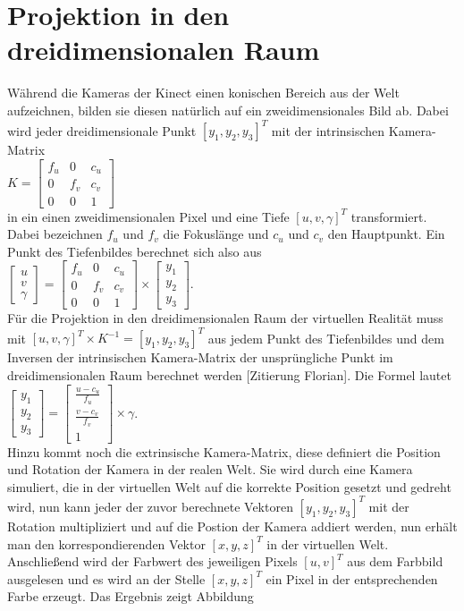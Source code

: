 \documentclass[a4paper]{IEEEtran}
\begin{document}
\section{Projektion in den dreidimensionalen Raum}
Während die Kameras der Kinect einen konischen Bereich aus der Welt aufzeichnen, bilden sie diesen natürlich auf ein zweidimensionales Bild ab. 
Dabei wird jeder dreidimensionale Punkt $[y_1,y_2,y_3]^T$ mit der intrinsischen Kamera-Matrix \\ [1cm]
$K = \begin{bmatrix}
f_u & 0 & c_u  \\
0 & f_v & c_v  \\
0 & 0 & 1  
\end{bmatrix}$\\[1cm]
in ein einen zweidimensionalen Pixel und eine Tiefe $[u,v,\gamma]^T$ transformiert. Dabei bezeichnen $f_u$ und $f_v$ die Fokuslänge und $c_u$ und $c_v$ den Hauptpunkt. Ein Punkt des Tiefenbildes berechnet sich also aus \\[1cm]
$\begin{bmatrix}
u \\
v \\
\gamma
\end{bmatrix}
= \begin{bmatrix}
f_u & 0 & c_u  \\
0 & f_v & c_v  \\
0 & 0 & 1  
\end{bmatrix}
\times
\begin{bmatrix}
y_1 \\
y_2 \\
y_3
\end{bmatrix}$.\\[1cm]
Für die Projektion in den dreidimensionalen Raum der virtuellen Realität muss mit $[u,v,\gamma]^T \times K^{-1} = [y_1,y_2,y_3]^T$ aus jedem Punkt des Tiefenbildes und dem Inversen der intrinsischen Kamera-Matrix der unsprüngliche Punkt im dreidimensionalen Raum berechnet werden [Zitierung Florian]. Die Formel lautet \\[1cm]
$\begin{bmatrix}
y_1 \\
y_2 \\
y_3
\end{bmatrix}
= \begin{bmatrix}
\frac{u - c_u}{f_u} \\
\frac{v - c_v}{f_v}  \\
1  
\end{bmatrix}
\times
\gamma$.\\[1cm]
Hinzu kommt noch die extrinsische Kamera-Matrix, diese definiert die Position und Rotation der Kamera in der realen Welt. Sie wird durch eine Kamera simuliert, die in der virtuellen Welt auf die korrekte Position gesetzt und gedreht wird, nun kann jeder der zuvor berechnete Vektoren $[y_1,y_2,y_3]^T$ mit der Rotation multipliziert und auf die Postion der Kamera addiert werden, nun erhält man den korrespondierenden Vektor $[x,y,z]^T$ in der virtuellen Welt. Anschließend  wird der Farbwert des jeweiligen Pixels $[u,v]^T$ aus dem Farbbild ausgelesen und es wird an der Stelle $[x,y,z]^T$ ein Pixel in der entsprechenden Farbe erzeugt. Das Ergebnis zeigt Abbildung 
\end{document}
